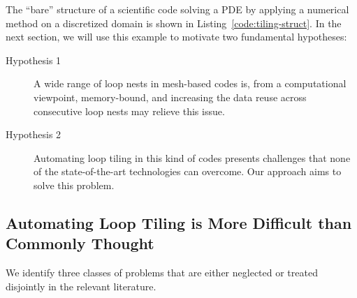 The ``bare'' structure of a scientific code solving a PDE by applying a numerical method on a discretized domain is shown in Listing~\ref{code:tiling-struct}. In the next section, we will use this example to motivate two fundamental hypotheses:

\begin{description}
\item[Hypothesis 1] A wide range of loop nests in mesh-based codes is, from a computational viewpoint, memory-bound, and increasing the data reuse across consecutive loop nests may relieve this issue.
\item[Hypothesis 2] Automating loop tiling in this kind of codes presents challenges that none of the state-of-the-art technologies can overcome. Our approach aims to solve this problem.
\end{description}




\subsection{Automating Loop Tiling is More Difficult than Commonly Thought}
We identify three classes of problems that are either neglected or treated disjointly in the relevant literature. 


